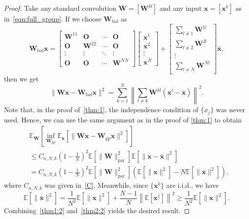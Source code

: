 \documentclass[preprint,12pt,authoryear]{elsarticle}
\numberwithin{equation}{section}
\theoremstyle{remark}
\newcommand\bO{\mathbf{O}}
\newcommand\bW{\mathbf{W}}
\newcommand\bx{\mathbf{x}}
\newcommand\bbE{\mathbb{E}}
\newcommand\gp{\mathrm{gp}}
\newcommand\bal{\mathrm{bal}}
\newcommand\param{\mathrm{par}}
\begin{document}
\begin{proof}
Take any standard convolution $\bW = [\bW^{kl}]$ and any input $\bx = [\bx^k]$ as in~\eqref{eqn:full_group}.
If we choose $\bW_{\bal}$ as
\begin{equation*}
    \bW_{\bal} \bx
    =
    \begin{bmatrix} \bW^{11} & \bO & \cdots & \bO \\
        \bO & \bW^{22} & \cdots & \bO \\
        \vdots & \vdots & \ddots & \vdots \\
        \bO & \bO & \cdots & \bW^{NN} \end{bmatrix}
    \begin{bmatrix} \bx^1 \\ \bx^2 \\ \vdots \\ \bx^N \end{bmatrix}
    + \begin{bmatrix} \sum_{l \neq 1} \bW^{1l} \\ \sum_{l \neq 2} \bW^{2l} \\ \vdots \\ \sum_{l \neq N} \bW^{Nl} \end{bmatrix}
    \bar{\bx},
\end{equation*}
then we get
\begin{equation*}
    \| \bW \bx - \bW_{\bal} \bx \|^2 = \sum_{k=1}^N \left\| \sum_{l \neq k} \bW^{kl} (\bx^l - \bar{\bx}) \right\|^2.
\end{equation*}
Note that, in the proof of~\cref{thm:1}, the independence condition of $\{ x_j \}$ was never used.
Hence, we can use the same argument as in the proof of \cref{thm:1} to obtain
\begin{equation}
\label{thm1:2}
    \begin{split}
        &\bbE_{\bW} \left[ \inf_{\bW_{\gp}} \bbE_{\bx} \left[ \| \bW \bx - \bW_{\gp} \bx \|^2 \right] \right] \\
        &\leq C_{n,N,k} \left( 1 - \frac{1}{N} \right)^2 \bbE \left[ \| \bW \|_{\param}^2 \right] \bbE \left[ \| \bx - \bar{\bx }\|^2 \right] \\
        &= C_{n,N,k} \left( 1 - \frac{1}{N} \right)^2 \bbE \left[ \| \bW \|_{\param}^2 \right] \left( \bbE \left[ \| \bx \|^2 \right] - N \bbE \left[ \| \bar{\bx} \|^2 \right] \right),
    \end{split}
\end{equation}
where $C_{n,N,k}$ was given in~\eqref{C}.
Meanwhile, since $\{ \bx^k \}$ are i.i.d., we have
\begin{equation}
\label{thm2:2}
    \bbE \left[ \| \bar{\bx} \|^2 \right] = \frac{1}{N^2} \bbE \left[ \| \bx \|^2 \right] + \frac{N-1}{N} \left\| \bbE \left[ \bx^1 \right] \right\|^2
    \geq \frac{1}{N^2} \bbE \left[ \| \bx \|^2 \right].
\end{equation}
Combining~\eqref{thm1:2} and~\eqref{thm2:2} yields the desired result.
\end{proof}
\end{document}
